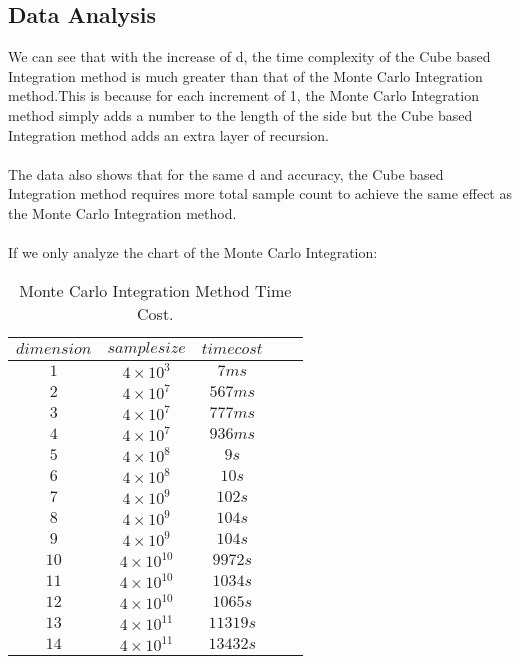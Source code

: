 \documentclass{article}
\begin{document}
		\subsection*{Data Analysis}
		We can see that with the increase of d, the time complexity of the Cube based Integration method is much greater than that of the Monte Carlo Integration method.This is because for each increment of 1, the Monte Carlo Integration method simply adds a number to the length of the side but the Cube based Integration method adds an extra layer of recursion.
		\\
		\\
		The data also shows that for the same d and accuracy, the Cube based Integration method requires more total sample count to achieve the same effect as the Monte Carlo Integration method.
		\\
		\\
		If we only analyze the chart of the Monte Carlo Integration:
		\begin{table}[htbp]
		\centering
		\begin{tabular}{ccccc}  %
			\hline
			$dimension$ &$sample size$ &$time cost$\\
			\hline
			$1$ &$4 \times 10 ^3$ &$7 ms$ \\
			$2$ &$4 \times 10 ^7$ &$567 ms$ \\
			$3$ &$4 \times 10 ^7$ &$777 ms$ \\
			$4$ &$4 \times 10 ^7$ &$936 ms$ \\
			$5$ &$4 \times 10 ^8$ &$9 s$ \\
			$6$ &$4 \times 10 ^8$ &$10 s$ \\
			$7$ &$4 \times 10 ^9$ &$102 s$ \\
			$8$ &$4 \times 10 ^9$ &$104 s$ \\
			$9$ &$4 \times 10 ^9$ &$104 s$ \\
			$10$ &$4 \times 10 ^{10}$ &$9972 s$ \\
			$11$ &$4 \times 10 ^{10}$ &$1034 s$ \\
			$12$ &$4 \times 10 ^{10}$ &$1065 s$ \\
			$13$ &$4 \times 10 ^{11}$ &$11319 s$ \\
			$14$ &$4 \times 10 ^{11}$ &$13432 s$ \\
			\hline
		\end{tabular}
		\caption{Monte Carlo Integration Method Time Cost.}
		\label{table:table1}
		\end{table}
		\\
		\\
\end{document}
